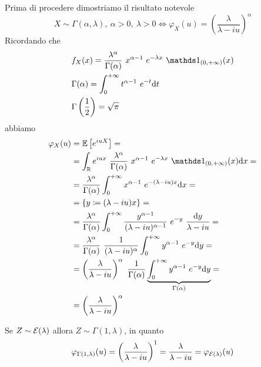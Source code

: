 \Soluzione{} %
Prima di procedere dimostriamo il risultato notevole
\[
X\sim\Gamma(\alpha,\lambda),\ \alpha>0,\ \lambda>0\iff\varphi_X(u)=\left(\frac{\lambda}{\lambda-iu} \right)^\alpha
\]
Ricordando che
\begin{gather*}
\begin{aligned}
&f_X(x)=\frac{\lambda^\alpha}{\Gamma(\alpha)}\ x^{\alpha-1}\ e^{-\lambda x}\ \Ind_{(0,+\infty)}(x) \\
&\Gamma(\alpha)=\int_{0}^{+\infty} t^{\alpha-1}\ e^{-t}\dt \\
&\Gamma\left(\frac{1}{2}\right)=\sqrt{\pi}
\end{aligned}
\end{gather*}
abbiamo
\begin{gather*}
\begin{aligned}
\varphi_X(u)&=\EE\left[e^{iuX}  \right]=\\
&=\int_\RR e^{iux}\ \frac{\lambda^\alpha}{\Gamma(\alpha)}\ x^{\alpha-1}\ e^{-\lambda x}\ \Ind_{(0,+\infty)}(x)\dx=\\
&=\frac{\lambda^\alpha}{\Gamma(\alpha)}\int_{0}^{+\infty} x^{\alpha-1}\ e^{-(\lambda-iu) x}\dx=\\
&=\{ y\coloneqq(\lambda-iu)x \}=\\
&=\frac{\lambda^\alpha}{\Gamma(\alpha)}\int_{0}^{+\infty} \frac{y^{\alpha-1}}{(\lambda-iu)^{\alpha-1}}\ e^{-y}\ \frac{\text{d}y}{\lambda-iu}=\\
&=\frac{\lambda^\alpha}{\Gamma(\alpha)}\ \frac{1}{(\lambda-iu)^{\alpha}}\int_{0}^{+\infty} y^{\alpha-1}\ e^{-y}\dy =\\
&=\left(\frac{\lambda}{\lambda-iu}\right)^\alpha\ \frac{1}{\Gamma(\alpha)}\underbrace{\int_{0}^{+\infty} y^{\alpha-1}\ e^{-y}\dy}_{\Gamma(\alpha)}=\\
&=\left(\frac{\lambda}{\lambda-iu}\right)^\alpha
\end{aligned}
\end{gather*}
\begin{oss}
Se $Z\sim\mathcal{E}(\lambda)$ allora $Z\sim\Gamma(1,\lambda)$, in quanto
\[
\varphi_{\Gamma(1,\lambda)}(u)=\left(\frac{\lambda}{\lambda-iu}\right)^1=\frac{\lambda}{\lambda-iu}=\varphi_{\mathcal{E}(\lambda)}(u)
\]
\end{oss}
